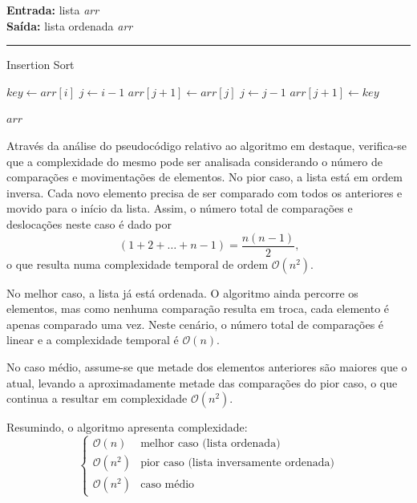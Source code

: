 \documentclass[conference]{IEEEtran}
\begin{document}
\begin{algorithm}[H]
    \raggedright
    \vspace{.1em}
    \textbf{Entrada:} lista \textit{arr} \\
    \textbf{Saída:} lista ordenada \textit{arr} \\
    \vspace{.5em}
    \hrule 
    \caption{Insertion Sort}
    \begin{algorithmic}[1]
            \State $key \gets arr[i]$
            \State $j \gets i - 1$
                \State $arr[j + 1] \gets arr[j]$
                \State $j \gets j - 1$
            \EndWhile
            \State $arr[j + 1] \gets key$
        \EndFor
    
        \State \Return $arr$
    \end{algorithmic}
\end{algorithm}

Através da análise do pseudocódigo relativo ao algoritmo em destaque, verifica-se que a complexidade do mesmo pode ser analisada considerando o número de comparações e movimentações de elementos. No pior caso, a lista está em ordem inversa. Cada novo elemento precisa de ser comparado com todos os anteriores e movido para o início da lista. Assim, o número total de comparações e deslocações neste caso é dado por
$$
(1 + 2 + \ldots + n-1) = \frac{n(n-1)}{2} \text{,}
$$
o que resulta numa complexidade temporal de ordem \(\mathcal{O}(n^2)\).

No melhor caso, a lista já está ordenada. O algoritmo ainda percorre os elementos, mas como nenhuma comparação resulta em troca, cada elemento é apenas comparado uma vez. Neste cenário, o número total de comparações é linear e a complexidade temporal é \(\mathcal{O}(n)\).

No caso médio, assume-se que metade dos elementos anteriores são maiores que o atual, levando a aproximadamente metade das comparações do pior caso, o que continua a resultar em complexidade \(\mathcal{O}(n^2)\).

Resumindo, o algoritmo apresenta complexidade:
\[
\begin{cases}
\mathcal{O}(n) & \text{melhor caso (lista ordenada)} \\
\mathcal{O}(n^2) & \text{pior caso (lista inversamente ordenada)} \\
\mathcal{O}(n^2) & \text{caso médio}
\end{cases}
\]
\end{document}
